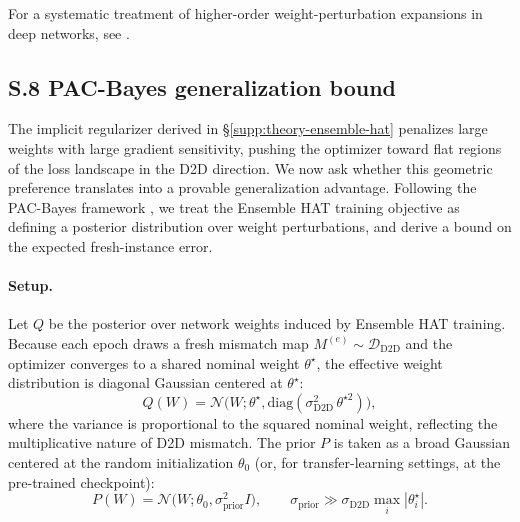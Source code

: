 For a systematic treatment of higher-order weight-perturbation expansions in deep networks, see \citet{roberts2022principles}.

\subsection*{S.8 PAC-Bayes generalization bound}

The implicit regularizer derived in \S\ref{supp:theory-ensemble-hat} penalizes large weights with large gradient sensitivity, pushing the optimizer toward flat regions of the loss landscape in the D2D direction. We now ask whether this geometric preference translates into a provable generalization advantage. Following the PAC-Bayes framework \citep{mcallester1999pac,dziugaite2017computing}, we treat the Ensemble HAT training objective as defining a posterior distribution over weight perturbations, and derive a bound on the expected fresh-instance error.

\paragraph{Setup.} Let $Q$ be the posterior over network weights induced by Ensemble HAT training. Because each epoch draws a fresh mismatch map $M^{(e)}\sim\mathcal{D}_{\text{D2D}}$ and the optimizer converges to a shared nominal weight $\theta^{\star}$, the effective weight distribution is diagonal Gaussian centered at $\theta^{\star}$:
\begin{equation}
    Q(W) = \mathcal{N}\bigl(W; \theta^{\star}, \mathrm{diag}(\sigma_{\text{D2D}}^2\,\theta^{\star2})\bigr),
    \label{eq:posterior-q}
\end{equation}
where the variance is proportional to the squared nominal weight, reflecting the multiplicative nature of D2D mismatch. The prior $P$ is taken as a broad Gaussian centered at the random initialization $\theta_0$ (or, for transfer-learning settings, at the pre-trained checkpoint):
\begin{equation}
    P(W) = \mathcal{N}\bigl(W; \theta_0, \sigma_{\text{prior}}^2 I\bigr),
    \qquad \sigma_{\text{prior}} \gg \sigma_{\text{D2D}}\max_i|\theta^{\star}_i|.
    \label{eq:prior-p}
\end{equation}

